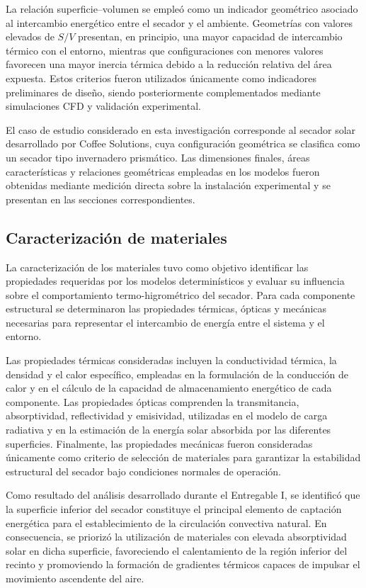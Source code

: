 La relación superficie--volumen se empleó como un indicador geométrico asociado al intercambio energético entre el secador y el ambiente. Geometrías con valores elevados de $S/V$ presentan, en principio, una mayor capacidad de intercambio térmico con el entorno, mientras que configuraciones con menores valores favorecen una mayor inercia térmica debido a la reducción relativa del área expuesta. Estos criterios fueron utilizados únicamente como indicadores preliminares de diseño, siendo posteriormente complementados mediante simulaciones CFD y validación experimental.

El caso de estudio considerado en esta investigación corresponde al secador solar desarrollado por Coffee Solutions, cuya configuración geométrica se clasifica como un secador tipo invernadero prismático. Las dimensiones finales, áreas características y relaciones geométricas empleadas en los modelos fueron obtenidas mediante medición directa sobre la instalación experimental y se presentan en las secciones correspondientes.


\subsection{Caracterización de materiales}

La caracterización de los materiales tuvo como objetivo identificar las propiedades requeridas por los modelos determinísticos y evaluar su influencia sobre el comportamiento termo-higrométrico del secador. Para cada componente estructural se determinaron las propiedades térmicas, ópticas y mecánicas necesarias para representar el intercambio de energía entre el sistema y el entorno.

Las propiedades térmicas consideradas incluyen la conductividad térmica, la densidad y el calor específico, empleadas en la formulación de la conducción de calor y en el cálculo de la capacidad de almacenamiento energético de cada componente. Las propiedades ópticas comprenden la transmitancia, absorptividad, reflectividad y emisividad, utilizadas en el modelo de carga radiativa y en la estimación de la energía solar absorbida por las diferentes superficies. Finalmente, las propiedades mecánicas fueron consideradas únicamente como criterio de selección de materiales para garantizar la estabilidad estructural del secador bajo condiciones normales de operación.

Como resultado del análisis desarrollado durante el Entregable I, se identificó que la superficie inferior del secador constituye el principal elemento de captación energética para el establecimiento de la circulación convectiva natural. En consecuencia, se priorizó la utilización de materiales con elevada absorptividad solar en dicha superficie, favoreciendo el calentamiento de la región inferior del recinto y promoviendo la formación de gradientes térmicos capaces de impulsar el movimiento ascendente del aire.

